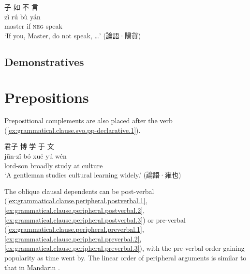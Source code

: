 \documentclass[UTF8, a4paper, oneside, scheme=plain, 12pt]{ctexrep}
\newcommand*{\citepages}[1]{pp.~{#1}}
\newcommand{\translate}[1]{`#1'}
\newcommand*{\category}[1]{\textsc{#1}}
\begin{document}
\begin{exe}
    \ex\label{ex:pronoun.idiom.didactic.disciple-to-master.1}
    \glll 子 如 不 言 \\
    zǐ rú bù yán \\
    master if \category{neg} speak \\
    \glt\translate{If you, Master, do not speak, \dots} \hfill (論語·陽貨)
\end{exe}

\section{Demonstratives}


\chapter{Prepositions}

Prepositional complements are also placed after the verb
(\ref{ex:grammatical.clause.svo.pp-declarative.1}).

\begin{exe}
    \ex\label{ex:grammatical.clause.svo.pp-declarative.1}
    \glll 君子 博 学 于 文 \\
    jūn-zǐ bó xué yú wén \\
    lord-son broadly study at culture \\
    \glt\translate{A gentleman studies cultural learning widely.} \hfill (論語·雍也)
\end{exe}

The oblique clausal dependents can be post-verbal
(\ref{ex:grammatical.clause.peripheral.postverbal.1},
\ref{ex:grammatical.clause.peripheral.postverbal.2},
\ref{ex:grammatical.clause.peripheral.postverbal.3})
or pre-verbal
(\ref{ex:grammatical.clause.peripheral.preverbal.1},
\ref{ex:grammatical.clause.peripheral.preverbal.2},
\ref{ex:grammatical.clause.peripheral.preverbal.3}),
with the pre-verbal order gaining popularity as time went by.
The linear order of peripheral arguments is similar to that in Mandarin
\citep[\citepages{286-287}]{he2005shiji}.
\end{document}
